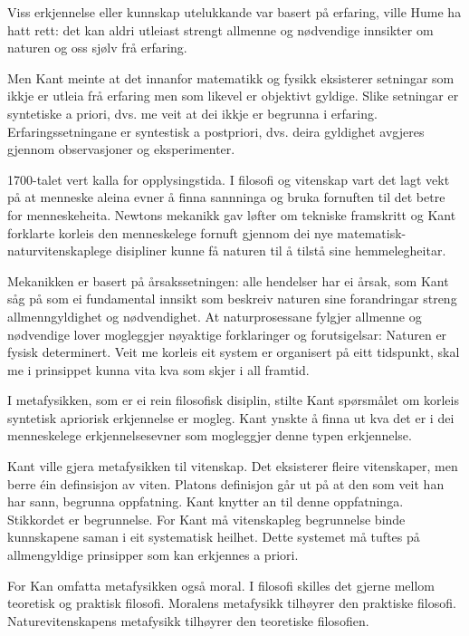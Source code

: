 \documentclass[a4paper]{IEEEtran}
\begin{document}
Viss erkjennelse eller kunnskap utelukkande var basert på erfaring, ville Hume ha hatt rett: det kan aldri utleiast strengt allmenne og nødvendige innsikter om naturen og oss sjølv frå erfaring.\bigskip

Men Kant meinte at det innanfor matematikk og fysikk eksisterer setningar som ikkje er utleia frå erfaring men som likevel er objektivt gyldige. Slike setningar er syntetiske a priori, dvs. me veit at dei ikkje er begrunna i erfaring. Erfaringssetningane er syntestisk a postpriori, dvs. deira gyldighet avgjeres gjennom observasjoner og eksperimenter.\bigskip

1700-talet vert kalla for opplysingstida. I filosofi og vitenskap vart det lagt vekt på at menneske aleina evner å finna sannninga og bruka fornuften til det betre for menneskeheita. Newtons mekanikk gav løfter om tekniske framskritt og Kant forklarte korleis den menneskelege fornuft gjennom dei nye matematisk-naturvitenskaplege disipliner kunne få naturen til å tilstå sine hemmelegheitar.\bigskip

Mekanikken er basert på årsakssetningen: alle hendelser har ei årsak, som Kant såg på som ei fundamental innsikt som beskreiv naturen sine forandringar streng allmenngyldighet og nødvendighet. At naturprosessane fylgjer allmenne og nødvendige lover mogleggjer nøyaktige forklaringer og forutsigelsar: Naturen er fysisk determinert. Veit me korleis eit system er organisert på eitt tidspunkt, skal me i prinsippet kunna vita kva som skjer i all framtid.\bigskip

I metafysikken, som er ei rein filosofisk disiplin, stilte Kant spørsmålet om korleis syntetisk apriorisk erkjennelse er mogleg. Kant ynskte å finna ut kva det er i dei menneskelege erkjennelsesevner som mogleggjer denne typen erkjennelse.\bigskip

Kant ville gjera metafysikken til vitenskap. Det eksisterer fleire vitenskaper, men berre éin definsisjon av viten. Platons definisjon går ut på at den som veit han har sann, begrunna oppfatning. Kant knytter an til denne oppfatninga. Stikkordet er begrunnelse. For Kant må vitenskapleg begrunnelse binde kunnskapene saman i eit systematisk heilhet. Dette systemet må tuftes på allmengyldige prinsipper som kan erkjennes a priori.\bigskip

For Kan omfatta metafysikken også moral. I filosofi skilles det gjerne mellom teoretisk og praktisk filosofi. Moralens metafysikk tilhøyrer den praktiske filosofi. Naturevitenskapens metafysikk tilhøyrer den teoretiske filosofien.\bigskip
\end{document}
